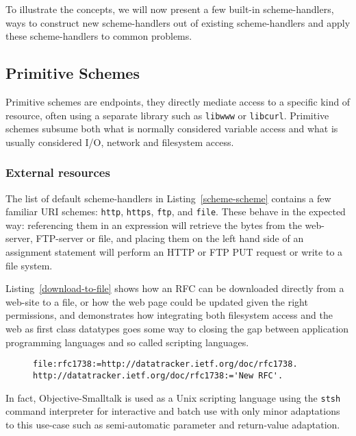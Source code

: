 \documentclass[preprint]{sigplanconf}
\begin{document}
To illustrate the concepts, we will now present a few built-in scheme-handlers, ways to construct new
scheme-handlers out of existing scheme-handlers and apply these scheme-handlers to common
problems.

\subsection{Primitive Schemes}
\label{primitiveSchemes}

Primitive schemes are endpoints, they directly
mediate access to a specific kind of resource, often using a separate
library such as {\tt libwww} or {\tt libcurl}.  Primitive schemes
subsume both what is normally considered variable access and 
what is usually considered I/O, network and filesystem access.


\subsubsection{External resources}
\label{externalResources}

The list of default scheme-handlers in Listing~\ref{scheme-scheme} contains a few familiar URI schemes:
{\tt http}, {\tt https}, {\tt ftp}, and {\tt file}.   These behave in the expected way:   referencing them in an expression will
retrieve the bytes from the web-server, FTP-server or file, and placing them on the left hand side of
an assignment statement will perform an HTTP or FTP PUT request or write to a file system. 
 
Listing~\ref{download-to-file} shows how an RFC can be downloaded directly from a web-site
to a file, or how the web page could be updated given the right permissions, and demonstrates how integrating both filesystem access and the web as first class datatypes
goes some way to closing the gap between application programming languages and so called
scripting languages.

\begin{figure}[htbp]
\begin{lstlisting}[style=numbers,label=download-to-file,caption=Downloading an RFC to a file.]
file:rfc1738:=http://datatracker.ietf.org/doc/rfc1738.
http://datatracker.ietf.org/doc/rfc1738:='New RFC'.
\end{lstlisting}
\end{figure}

In fact,  Objective-Smalltalk is used as a Unix scripting language using the {\tt stsh} command
interpreter for interactive and batch use with only minor adaptations to this use-case such
as semi-automatic parameter and return-value adaptation.
\end{document}
